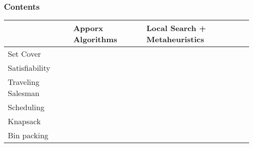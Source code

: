 \documentclass[smaller,aspectratio=169,ignorenonframetext,compress,sans,fleqn,xcolor=dvipsnames,fleqn,table,stillsansserifmath,stillsansseriftext,stillsansserifsmall,stillsansseriflarge]{beamer}
\begin{document}
\begin{frame}%

\frametitle{Contents}

\begin{table}
  \centering
\begin{tabular}{l|p{4.5cm}p{4.5cm}}
&Apporx Algorithms&Local Search + Metaheuristics\\
\hline
  Set Cover&&\\
Satisfiability&&\\
Traveling Salesman&&\\
Scheduling&&\\
Knapsack&&\\
Bin packing&&
\end{tabular}
\end{table}
  
\end{frame}
\end{document}
